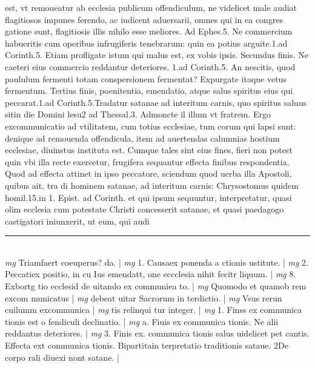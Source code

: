 \documentclass{article}
\begin{document}
\begin{pages}
est, vt remoueatur ab ecclesia publicum offendiculum, ne videlicet male audiat flagitiosos impunes ferendo, ac iudicent aduersarii, omnes qui in ea congres gatione sunt, flagitiosis illis nihilo esse meliores. Ad Ephes.5. Ne commercium habueritis cum operibus infrugiferis tenebrarum: quin ea potius arguite.1.ad Corinth.5. Etiam profligate istum qui malus est, ex vobis ipsis. Secundus finis. Ne caeteri eius commercio reddantur deteriores. 1.ad Corinth.5. An nescitis, quod paululum fermenti totam conspersionem fermentat? Expurgate itaque  vetus fermentum. Tertius finis, poenitentia, emendatio, atque  salus spiritus eius qui peccarat.1.ad Corinth.5.Tradatur satanae ad interitum carnis, quo spiritus saluus sitin die Domini lesu2 ad Thessal.3. Admoncte il illum vt fratrem. Ergo excommunicatio ad vtilitatem, cum totius ecclesiae, tum corum qui lapsi sunt: denique  ad remouenda offendicula, item ad auertendas calumnias hostium ecclesiae, diuinstus instituta est. Cumque tales sint eius fines, fieri non potest quin vbi illa recte exercetur, frugifera sequantur effecta finibus respondentia. Quod ad effecta attinet in ipso peccatore, sciendum quod uerba illa Apostoli, quibus ait, tra di hominem satanae, ad interitum carnis: Chrysostomus quidem homil.15.in 1. Epist. ad Corinth. et qui ipsum sequuntur, interpretatur, quasi olim ecclesia cum potestate Christi concesserit satanae, et quasi paedagogo castigatori iniunxerit, ut eum, qui audi\pend
\vspace{0.5cm}\noindent
\vspace{0.2cm}\rule{1cm}{0.2pt}\\ 
\hspace{0.2cm}\textit{mg}
\footnotesize Triamfaert coeuperus? da. 
\normalsize| 
\hspace{0.2cm}\textit{mg}
\footnotesize 1. Causaex ponenda a ctionis ustitute. 
\normalsize| 
\hspace{0.2cm}\textit{mg}
\footnotesize 2. Peccatiex positio, in cu Ius emendatt, one eccclesia nihit fecitr liquum. 
\normalsize| 
\hspace{0.2cm}\textit{mg}
\footnotesize 8. Exbortg tio ecclesid de uitando ex communiea to. 
\normalsize| 
\hspace{0.2cm}\textit{mg}
\footnotesize Quomodo et quamob rem excom municatus 
\normalsize| 
\hspace{0.2cm}\textit{mg}
\footnotesize debeat uitar Sacrorum in terdictio. 
\normalsize| 
\hspace{0.2cm}\textit{mg}
\footnotesize Vsus rerun cuilumm excommunica
\normalsize| 
\hspace{0.2cm}\textit{mg}
\footnotesize tis relinqui tur integer. 
\normalsize| 
\hspace{0.2cm}\textit{mg}
\footnotesize 1. Finss ex communica tionis est o fendiculi declinatio. 
\normalsize| 
\hspace{0.2cm}\textit{mg}
\footnotesize a. Fiuis ex communica tionis. Ne alii reddantus deteriores. 
\normalsize| 
\hspace{0.2cm}\textit{mg}
\footnotesize 3. Finis ex. communica tionis salus uidelicet pet cantis. Effecta ext communica tionis. Bipartitain terpretatio traditionis sataue. 2De corpo rali diuexi nont satane. 
\normalsize| 

\end{pages}
\end{document}
